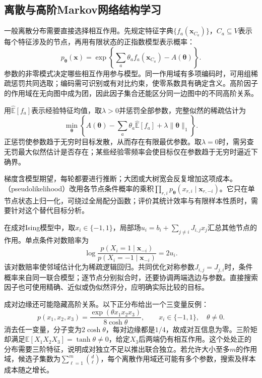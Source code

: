\subsection{离散与高阶Markov网络结构学习}
\label{sec:pgm-structure-learning-discrete}

一般离散分布需要直接选择相互作用。先规定特征字典$\{f_a(\bm{x}_{C_a})\}$，$C_a\subseteq V$表示每个特征涉及的节点，再用有限状态的正指数模型表示概率：
\[
  p_{\bm{\theta}}(\bm{x})
  =\exp\!\left\{\sum_a\theta_a f_a(\bm{x}_{C_a})
                    -A(\bm{\theta})\right\}.
\]
参数的非零模式决定哪些相互作用参与模型。同一作用域有多项编码时，可用组稀疏惩罚共同选取；编码需可识别或有对比约束，使零系数具有确定含义。高阶因子的作用域在无向图中成为团，因此因子集合还能区分同一边图中的不同高阶关系。

用$\widehat{\mathbb{E}}[f_a]$表示经验特征均值，取$\lambda>0$并惩罚全部参数，完整似然的稀疏估计为
\[
  \min_{\bm{\theta}}\left\{
    A(\bm{\theta})-\sum_a\theta_a\widehat{\mathbb{E}}[f_a]
      +\lambda\lVert\bm{\theta}\rVert_1\right\}.
\]
正惩罚使参数趋于无穷时目标发散，从而存在有限最优参数。取$\lambda=0$时，需另查无罚最大似然估计是否存在；某些经验零频率会使目标仅在参数趋于无穷时逼近下确界。

梯度含模型期望，每轮都要进行推断；大团或大树宽会反复增加这项成本。（pseudolikelihood）改用各节点条件概率的乘积$\prod_{r,i}p_{\bm{\theta}}(x_{r,i}\mid\bm{x}_{r,-i})$。它只在单节点状态上归一化，可绕过全局配分函数；评价其统计效率与有限样本性质时，需要针对这个替代目标分析。

在成对Ising模型中，取$x_i\in\{-1,1\}$，局部场$u_i=b_i+\sum_{j\ne i}J_{i,j}x_j$汇总其他节点的作用。单点条件对数赔率为
\[
  \log\frac{p(X_i=1\mid\bm{x}_{-i})}
                {p(X_i=-1\mid\bm{x}_{-i})}=2u_i.
\]
该对数赔率使邻域估计化为稀疏逻辑回归。共同优化对称参数$J_{i,j}=J_{j,i}$时，条件概率来自同一联合模型；逐节点分别拟合时，还要协调两端选边与参数。直接搜索因子也可使用精确、近似或伪似然评分，应明确实际比较的目标。

成对边缘还可能隐藏高阶关系。以下正分布给出一个三变量反例：
\[
  p(x_1,x_2,x_3)
  =\frac{\exp(\theta x_1x_2x_3)}{8\cosh\theta},
  \qquad x_i\in\{-1,1\},\quad \theta\ne0.
\]
消去任一变量，分子变为$2\cosh\theta$，每对边缘都是$1/4$，故成对互信息为零。三阶矩却满足$\mathbb{E}[X_1X_2X_3]=\tanh\theta\ne0$，给定$X_3$后两端仍有相互作用。这个处处正的分布需要三阶特征，说明成对独立不足以推出联合独立。若允许大小至多$m$的作用域，候选子集数为$\sum_{\ell=1}^{m}\binom d\ell$，每个离散作用域还可能有多个参数，搜索及样本成本随之增长。

